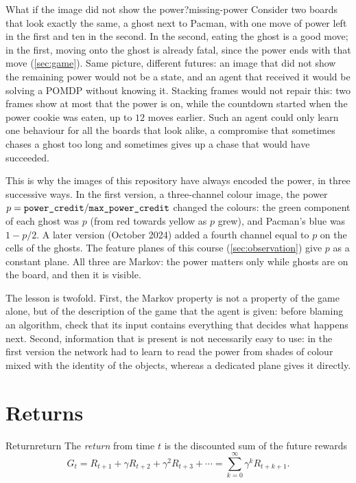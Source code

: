 \begin{pacman}{What if the image did not show the power?}{missing-power}
  Consider two boards that look exactly the same, a ghost next to Pacman,
  with one move of power left in the first and ten in the second. In the
  second, eating the ghost is a good move; in the first, moving onto the
  ghost is already fatal, since the power ends with that move
  (\cref{sec:game}). Same picture,
  different futures: an image that did not show the remaining power would
  not be a state, and an agent that received it would be solving a POMDP
  without knowing it. Stacking frames would not repair this: two frames
  show at most that the power is on, while the countdown started when the
  power cookie was eaten, up to $12$ moves earlier. Such an agent could
  only learn one behaviour for all the boards that look alike, a compromise
  that sometimes chases a ghost too long and sometimes gives up a chase
  that would have succeeded.

  This is why the images of this repository have always encoded the power,
  in three successive ways. In the first version, a three-channel colour
  image, the power $p = \texttt{power\_credit} / \texttt{max\_power\_credit}$
  changed the colours: the green component of each ghost was $p$ (from red
  towards yellow as $p$ grew), and Pacman's blue was $1 - p/2$. A later version
  (October 2024) added a fourth channel equal to $p$ on the cells of the
  ghosts. The feature planes of this course (\cref{sec:observation}) give
  $p$ as a constant plane. All three are Markov: the power matters only
  while ghosts are on the board, and then it is visible.

  The lesson is twofold. First, the Markov property is not a property of
  the game alone, but of the description of the game that the agent is
  given: before blaming an algorithm, check that its input contains
  everything that decides what happens next. Second, information that is
  present is not necessarily easy to use: in the first version the network
  had to learn to read the power from shades of colour mixed with the
  identity of the objects, whereas a dedicated plane gives it directly.
\end{pacman}

\section{Returns}

\begin{definition}{Return}{return}
  The \emph{return} from time $t$ is the discounted sum of the future
  rewards
  \begin{equation}
    \label{eq:return}
    G_t = R_{t+1} + \gamma R_{t+2} + \gamma^2 R_{t+3} + \cdots
    = \sum_{k=0}^{\infty} \gamma^k R_{t+k+1}.
  \end{equation}
\end{definition}

